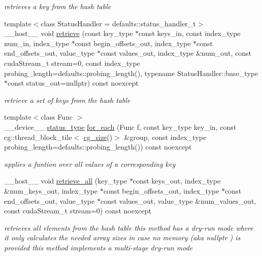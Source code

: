 \begin{DoxyCompactItemize}
\begin{DoxyCompactList}\small\item\em retrieves a key from the hash table \end{DoxyCompactList}\item 
{\footnotesize template$<$class Status\+Handler  = defaults\+::status\+\_\+handler\+\_\+t$>$ }\\\+\_\+\+\_\+host\+\_\+\+\_\+ void \hyperlink{classwarpcore_1_1BucketListHashTable_a2fd57d5d8e96cd2dd56f331217f3f185}{retrieve} (const key\+\_\+type $\ast$const keys\+\_\+in, const index\+\_\+type num\+\_\+in, index\+\_\+type $\ast$const begin\+\_\+offsets\+\_\+out, index\+\_\+type $\ast$const end\+\_\+offsets\+\_\+out, value\+\_\+type $\ast$const values\+\_\+out, index\+\_\+type \&num\+\_\+out, const cuda\+Stream\+\_\+t stream=0, const index\+\_\+type probing\+\_\+length=defaults\+::probing\+\_\+length(), typename Status\+Handler\+::base\+\_\+type $\ast$const status\+\_\+out=nullptr) const noexcept
\begin{DoxyCompactList}\small\item\em retrieve a set of keys from the hash table \end{DoxyCompactList}\item 
{\footnotesize template$<$class Func $>$ }\\\+\_\+\+\_\+device\+\_\+\+\_\+ \hyperlink{classwarpcore_1_1Status}{status\+\_\+type} \hyperlink{classwarpcore_1_1BucketListHashTable_a6d28e8d717936264eb4c2c1a0999c962}{for\+\_\+each} (Func f, const key\+\_\+type key\+\_\+in, const cg\+::thread\+\_\+block\+\_\+tile$<$ \hyperlink{classwarpcore_1_1BucketListHashTable_a3807ac1b39b47617d862c5dd17f21330}{cg\+\_\+size}()$>$ \&group, const index\+\_\+type probing\+\_\+length=defaults\+::probing\+\_\+length()) const noexcept
\begin{DoxyCompactList}\small\item\em applies a funtion over all values of a corresponding key \end{DoxyCompactList}\item 
\+\_\+\+\_\+host\+\_\+\+\_\+ void \hyperlink{classwarpcore_1_1BucketListHashTable_a16b5c045fb0e1e6c2a03114edf111c83}{retrieve\+\_\+all} (key\+\_\+type $\ast$const keys\+\_\+out, index\+\_\+type \&num\+\_\+keys\+\_\+out, index\+\_\+type $\ast$const begin\+\_\+offsets\+\_\+out, index\+\_\+type $\ast$const end\+\_\+offsets\+\_\+out, value\+\_\+type $\ast$const values\+\_\+out, value\+\_\+type \&num\+\_\+values\+\_\+out, const cuda\+Stream\+\_\+t stream=0) const noexcept
\begin{DoxyCompactList}\small\item\em retrieves all elements from the hash table  this method has a dry-\/run mode where it only calculates the needed array sizes in case no memory (aka {\ttfamily nullptr} ) is provided  this method implements a multi-\/stage dry-\/run mode \end{DoxyCompactList}\item 

\end{DoxyCompactItemize}
